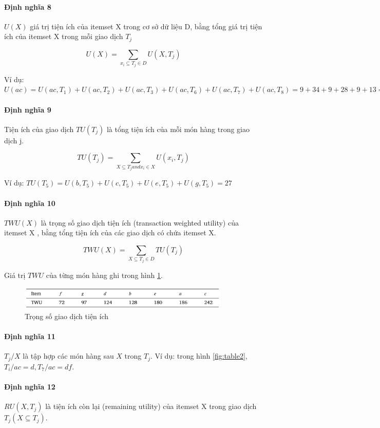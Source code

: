 \paragraph{Định nghĩa 8} $U(X)$ giá trị tiện ích của itemset X trong cơ sở dữ liệu D, bằng tổng giá trị tiện ích của itemset X trong mỗi giao dịch $T_j$

$$ U(X) = \sum_{x_i \subseteq T_j \in D} U(X, T_j) $$

Ví dụ: $U(ac) = U(ac, T_1) + U(ac, T_2) + U(ac, T_3) + U(ac, T_6) + U(ac, T_7) + U(ac, T_8) = 9 + 34 + 9 + 28 + 9 + 13 = 101 $

\paragraph{Định nghĩa 9} Tiện ích của giao dịch $TU(T_j)$ là tổng tiện ích của mỗi món hàng trong giao dịch j.

$$ TU(T_j) = \sum_{X \subseteq T_j and x_i \in X} U(x_i, T_j) $$

Ví dụ: $TU(T_5) = U(b, T_5) + U(c, T_5) + U(e, T_5) + U(g, T_5) = 27$

\paragraph{Định nghĩa 10}  $TWU(X)$ là trọng số giao dịch tiện ích (transaction weighted utility) của itemset X , bằng tổng tiện ích của các giao dịch có chứa itemset X.

$$ TWU(X) = \sum_{X \subseteq T_j \in D} TU(T_j) $$

Giá trị $TWU$ của từng món hàng ghi trong hình \ref{fig:table4}.



\begin{figure}[h]
\centering
\includegraphics[width=0.9\textwidth]{image/table/table4.PNG}
\caption{\label{fig:table4} Trọng số giao dịch tiện ích  }
\end{figure}

\paragraph{Định nghĩa 11} $T_j/X$ là tập hợp các món hàng sau $X$ trong $T_j$. Ví dụ: trong hình \ref{fig:table2}, $T_i/ac = d, T_7/ac = df$.

\paragraph{Định nghĩa 12} $RU(X, T_j)$  là tiện ích còn lại (remaining utility) của itemset X trong giao dịch $T_j(X \subseteq T_j)$.

